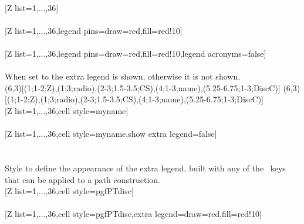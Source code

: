 \\ [5pt][Z list={1,...,36}]%
\\ [5pt]\makebox[\linewidth][c]{\scalebox{.6}{\pgfPT[Z list={1,...,36}]}}%
\\ [10pt][Z list={1,...,36},legend pins={draw=red,fill=red!10}]%
\\ [5pt]\makebox[\linewidth][c]{\scalebox{.6}{\pgfPT[Z list={1,...,36},legend pins={draw=red,fill=red!10}]}}%
\\ [10pt][Z list={1,...,36},legend pins={draw=red,fill=red!10},legend acronyms=false]%
\\ [5pt]\makebox[\linewidth][c]{\scalebox{.6}{\pgfPT[Z list={1,...,36},legend pins={draw=red,fill=red!10},legend acronyms=false]}}%
\\ [0pt]\pgfPTendstyle%
\label{option_show extra legend}%
%
{When set to  the extra legend is shown, otherwise it is not shown.}%
\\ [10pt](6,3)[(1;1-2;Z),(1;3;radio),(2-3;1.5-3.5;CS),(4;1-3;name),(5.25-6.75;1-3;DiscC)]%
(6,3)[(1;1-2;Z),(1;3;radio),(2-3;1.5-3.5;CS),(4;1-3;name),(5.25-6.75;1-3;DiscC)]%
\\ [-4pt][Z list={1,...,36},cell style=myname]%
\\ [5pt]\makebox[\linewidth][c]{\scalebox{.6}{\pgfPT[Z list={1,...,36},cell style=myname]}}%
\\ [10pt][Z list={1,...,36},cell style=myname,show extra legend=false]%
\\ [5pt]\makebox[\linewidth][c]{\scalebox{.6}{\pgfPT[Z list={1,...,36},cell style=myname,show extra legend=false]}}%
\\ [0pt]\pgfPTendoption%
\label{style_extra legend}%
%
{\ \\ [4pt]Style to define the appearance of the extra legend, built with any of the \txttikz\ keys that can be applied to a path construction.}%
\\ [5pt][Z list={1,...,36},cell style=pgfPTdisc]%
\\ [10pt]\makebox[\linewidth][c]{\scalebox{.6}{\pgfPT[Z list={1,...,36},cell style=pgfPTdisc]}}%
\\ [10pt][Z list={1,...,36},cell style=pgfPTdisc,extra legend={draw=red,fill=red!10}]%
